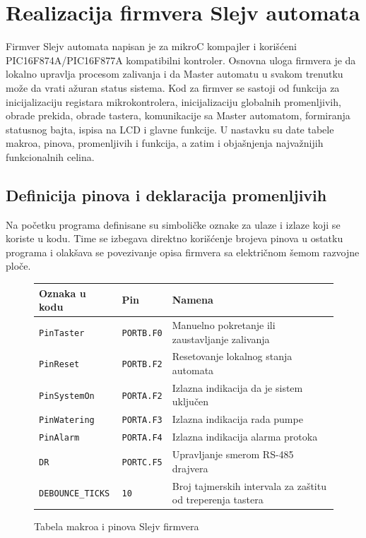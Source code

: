 \documentclass[12pt]{article}
\numberwithin{figure}{section}
\begin{document}
\section{Realizacija firmvera Slejv automata}
  Firmver Slejv automata napisan je za mikroC kompajler i korišćeni PIC16F874A/PIC16F877A kompatibilni kontroler.
  Osnovna uloga firmvera je da lokalno upravlja procesom zalivanja i da Master automatu u svakom trenutku može da vrati ažuran status sistema. 
  Kod za firmver se sastoji od funkcija za inicijalizaciju registara mikrokontrolera, inicijalizaciju globalnih promenljivih, obrade prekida, obrade tastera, komunikacije sa Master automatom, formiranja statusnog bajta, ispisa na LCD i glavne funkcije.
  U nastavku su date tabele makroa, pinova, promenljivih i funkcija, a zatim i objašnjenja najvažnijih funkcionalnih celina.

  \subsection{Definicija pinova i deklaracija promenljivih}
  Na početku programa definisane su simboličke oznake za ulaze i izlaze koji se koriste u kodu.
  Time se izbegava direktno korišćenje brojeva pinova u ostatku programa i olakšava se povezivanje opisa firmvera sa električnom šemom razvojne ploče.

  \begin{figure}[ht]
  \centering
  \small
  \begin{tabular}{|m{3.5cm}|m{3cm}|m{6.5cm}|}
    \hline
    Oznaka u kodu & Pin & Namena \\ \hline
    \texttt{PinTaster} & \texttt{PORTB.F0} & Manuelno pokretanje ili zaustavljanje zalivanja \\ \hline
    \texttt{PinReset} & \texttt{PORTB.F2} & Resetovanje lokalnog stanja automata \\ \hline
    \texttt{PinSystemOn} & \texttt{PORTA.F2} & Izlazna indikacija da je sistem uključen \\ \hline
    \texttt{PinWatering} & \texttt{PORTA.F3} & Izlazna indikacija rada pumpe \\ \hline
    \texttt{PinAlarm} & \texttt{PORTA.F4} & Izlazna indikacija alarma protoka \\ \hline
    \texttt{DR} & \texttt{PORTC.F5} & Upravljanje smerom RS-485 drajvera \\ \hline
    \texttt{DEBOUNCE\_TICKS} & \texttt{10} & Broj tajmerskih intervala za zaštitu od treperenja tastera \\ \hline
  \end{tabular}
  \caption{Tabela makroa i pinova Slejv firmvera}
  \end{figure}
  \normalsize
\end{document}
